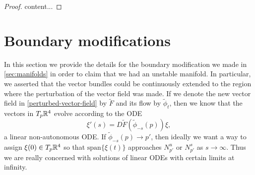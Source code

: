 \begin{proof}
	content...
\end{proof}
\section{Boundary modifications}\label{sec:boundary-modifications}

In this section we provide the details for the boundary modification we made in \cref{sec:manifolds} in order to claim that we had an unstable manifold. In particular, we asserted that the vector bundles could be continuously extended to the region where the perturbation of the vector field was made. If we denote the new vector field in \cref{perturbed-vector-field} by \(\tilde F\) and its flow by \(\tilde \phi_t\), then we know that the vectors in \(T_p\mathbb{R}^4\) evolve according to the ODE
\begin{equation}\label{flow-tangent-vectors-perturbed}
	\xi'(s) = D\tilde F(\tilde \phi_{-s}(p)) \xi,
\end{equation}
a linear non-autonomous ODE. If \(\tilde \phi_{-s}(p) \to p'\), then ideally we want a way to assign \(\xi(0) \in T_p\mathbb{R}^4\) so that \(\mathrm{span}\{\xi(t)\}\) approaches \(N^u_{p'}\) or \(N^s_{p'}\) as \(s\to \infty\). Thus we are really concerned with solutions of linear ODEs with certain limits at infinity.

